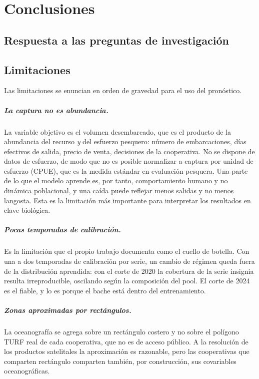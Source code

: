 \chapter{Conclusiones}
\label{cap:conclusiones}

\section{Respuesta a las preguntas de investigación}



\section{Limitaciones}
\label{sec:limitaciones}

Las limitaciones se enuncian en orden de gravedad para el uso del pronóstico.

\paragraph{La captura no es abundancia.} La variable objetivo es el volumen desembarcado, que
es el producto de la abundancia del recurso \emph{y} del esfuerzo pesquero: número de
embarcaciones, días efectivos de salida, precio de venta, decisiones de la cooperativa. No se
dispone de datos de esfuerzo, de modo que no es posible normalizar a captura por unidad de
esfuerzo (CPUE), que es la medida estándar en evaluación pesquera. Una parte de lo que el
modelo aprende es, por tanto, comportamiento humano y no dinámica poblacional, y una caída
puede reflejar menos salidas y no menos langosta. Esta es la limitación más importante para
interpretar los resultados en clave biológica.

\paragraph{Pocas temporadas de calibración.} Es la limitación que el propio trabajo documenta
como el cuello de botella. Con una a dos temporadas de calibración por serie, un cambio de
régimen queda fuera de la distribución aprendida: con el corte de 2020 la cobertura de la serie
insignia resulta irreproducible, oscilando según la composición del pool. El corte de 2024 es
el fiable, y lo es porque el bache está dentro del entrenamiento.

\paragraph{Zonas aproximadas por rectángulos.} La oceanografía se agrega sobre un rectángulo
costero y no sobre el polígono TURF real de cada cooperativa, que no es de acceso público. A la
resolución de los productos satelitales la aproximación es razonable, pero las cooperativas que
comparten rectángulo comparten también, por construcción, sus covariables oceanográficas.

